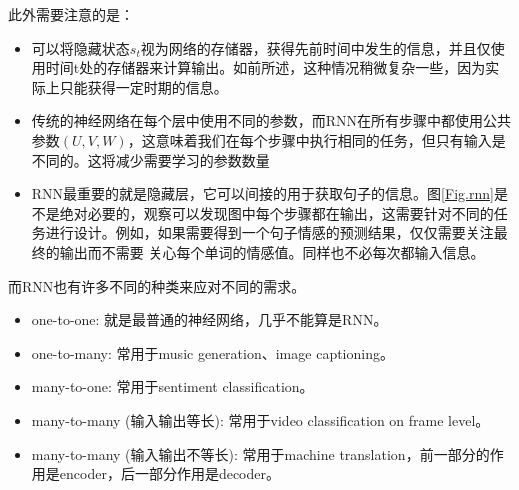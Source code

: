 \documentclass[supercite]{HustGraduPaper}
\theoremstyle{definition}
\begin{document}
此外需要注意的是：
\begin{itemize}
  \item 可以将隐藏状态$s_t$视为网络的存储器，获得先前时间中发生的信息，并且仅使用时间t处的存储器来计算输出。如前所述，这种情况稍微复杂一些，因为实际上只能获得一定时期的信息。
  \item 传统的神经网络在每个层中使用不同的参数，而RNN在所有步骤中都使用公共参数$(U,V,W)$，这意味着我们在每个步骤中执行相同的任务，但只有输入是不同的。这将减少需要学习的参数数量
  \item RNN最重要的就是隐藏层，它可以间接的用于获取句子的信息。图\ref{Fig.rnn}是不是绝对必要的，观察可以发现图中每个步骤都在输出，这需要针对不同的任务进行设计。例如，如果需要得到一个句子情感的预测结果，仅仅需要关注最终的输出而不需要
  关心每个单词的情感值。同样也不必每次都输入信息。
\end{itemize}

而RNN也有许多不同的种类来应对不同的需求。
\begin{itemize}
  \item one-to-one: 就是最普通的神经网络，几乎不能算是RNN。
  \item one-to-many: 常用于music generation、image captioning。
  \item many-to-one: 常用于sentiment classification。
  \item many-to-many (输入输出等长): 常用于video classification on frame level。
  \item many-to-many (输入输出不等长): 常用于machine translation，前一部分的作用是encoder，后一部分作用是decoder。
\end{itemize}
\end{document}
